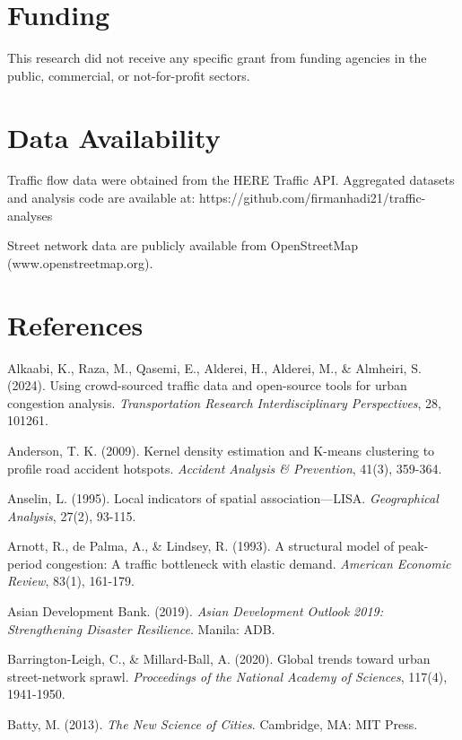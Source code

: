 \documentclass[12pt,a4paper]{article}
\begin{document}
\section*{Funding}

This research did not receive any specific grant from funding agencies in the public, commercial, or not-for-profit sectors.



\section*{Data Availability}

Traffic flow data were obtained from the HERE Traffic API. Aggregated datasets and analysis code are available at: https://github.com/firmanhadi21/traffic-analyses

Street network data are publicly available from OpenStreetMap (www.openstreetmap.org).



\section*{References}

Alkaabi, K., Raza, M., Qasemi, E., Alderei, H., Alderei, M., \& Almheiri, S. (2024). Using crowd-sourced traffic data and open-source tools for urban congestion analysis. \emph{Transportation Research Interdisciplinary Perspectives}, 28, 101261.

Anderson, T. K. (2009). Kernel density estimation and K-means clustering to profile road accident hotspots. \emph{Accident Analysis \& Prevention}, 41(3), 359-364.

Anselin, L. (1995). Local indicators of spatial association---LISA. \emph{Geographical Analysis}, 27(2), 93-115.

Arnott, R., de Palma, A., \& Lindsey, R. (1993). A structural model of peak-period congestion: A traffic bottleneck with elastic demand. \emph{American Economic Review}, 83(1), 161-179.

Asian Development Bank. (2019). \emph{Asian Development Outlook 2019: Strengthening Disaster Resilience}. Manila: ADB.

Barrington-Leigh, C., \& Millard-Ball, A. (2020). Global trends toward urban street-network sprawl. \emph{Proceedings of the National Academy of Sciences}, 117(4), 1941-1950.

Batty, M. (2013). \emph{The New Science of Cities}. Cambridge, MA: MIT Press.
\end{document}
